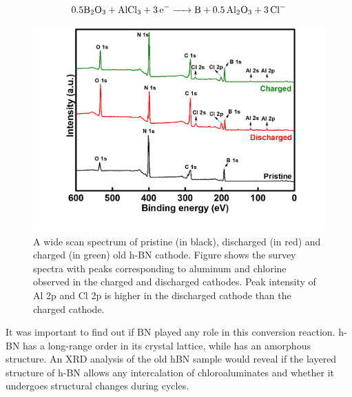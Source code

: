 \begin{equation}
  0.5\ce{B2O3 + AlCl3 + 3e- -> B + 0.5Al2O3 + 3Cl-}
\end{equation}

\begin{figure}[tbh!]
\centering
\includegraphics[width=\textwidth]{Figures/BOhBN/hBNXPS}
\caption{A wide scan spectrum of pristine (in black), discharged (in red) and charged (in green) old h-BN cathode. Figure shows the survey spectra with peaks corresponding to aluminum and chlorine observed in the charged and discharged cathodes. Peak intensity of Al 2p and Cl 2p is higher in the discharged cathode than the charged cathode.}
\label{Figures/BOhBN:hBNXPS}
\end{figure}

It was important to find out if BN played any role in this conversion reaction. h-BN has a long-range order in its crystal lattice, while  has an amorphous structure. An XRD analysis of the old hBN sample would reveal if the layered structure of h-BN allows any intercalation of chloroaluminates and whether it undergoes structural changes during cycles.

